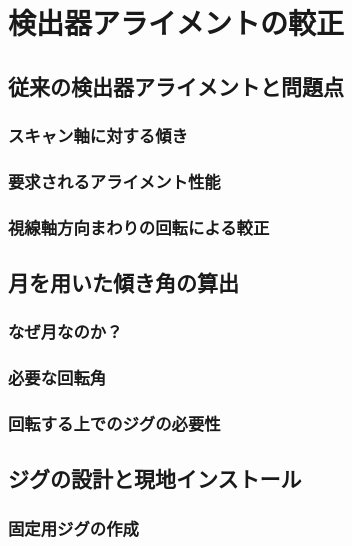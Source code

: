 \chapter{検出器アライメントの較正}

\section{従来の検出器アライメントと問題点}

\subsection{スキャン軸に対する傾き}

\subsection{要求されるアライメント性能}

\subsection{視線軸方向まわりの回転による較正}

\section{月を用いた傾き角の算出}

\subsection{なぜ月なのか？}

\subsection{必要な回転角}

\subsection{回転する上でのジグの必要性}

\section{ジグの設計と現地インストール}

\subsection{固定用ジグの作成}

